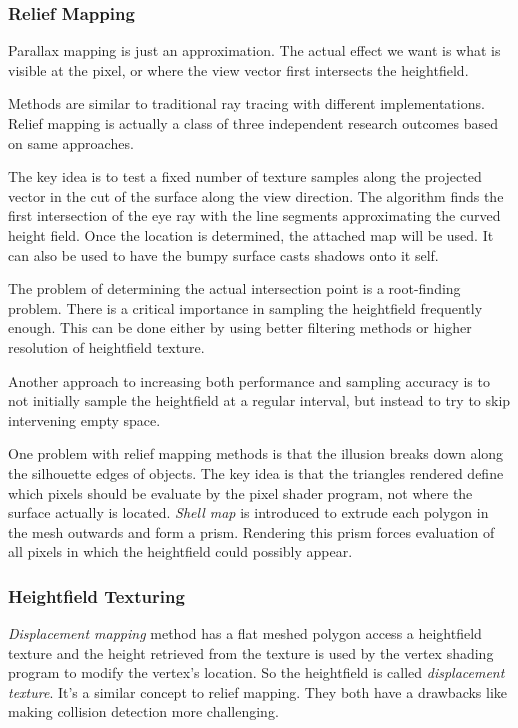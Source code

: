 \documentclass[10pt, a4paper]{article}
\begin{document}
    
    \subsubsection{Relief Mapping}
        Parallax mapping is just an approximation. The actual effect we want is what is visible at the pixel, or where the view vector first  intersects the heightfield. 

        Methods are similar to traditional ray tracing with different implementations. Relief mapping is actually a class of three independent research outcomes based on same approaches. 

        The key idea is to test a fixed number of texture samples along the projected vector in the cut of the surface along the view direction. The algorithm finds the first intersection of the eye ray with the line segments approximating the curved height field. Once the location is determined, the attached map will be used. It can also be used to have the  bumpy surface casts shadows onto it self.  

        The problem of determining the actual intersection point is a root-finding problem. There is a critical importance in sampling the heightfield frequently enough. This can be done either by using better filtering methods or higher resolution of heightfield texture. 

        Another approach to increasing both performance and sampling accuracy is to not initially sample the heightfield at a regular interval, but instead to try to skip intervening empty space. 

        One problem with relief mapping methods is that the illusion breaks down along the silhouette edges of objects.  The key idea is that the triangles rendered define which pixels should be evaluate by the pixel shader program, not where the surface actually is located. \emph{Shell map} is introduced to extrude each polygon in the mesh outwards and form a prism. Rendering this prism forces evaluation of all pixels in which the heightfield could possibly appear. 
    \subsubsection{Heightfield Texturing}
        \emph{Displacement mapping} method has a flat meshed polygon access a heightfield texture and the height retrieved from the texture is used by the vertex shading program to modify the vertex's location. So the heightfield is called \emph{displacement texture}. It's a similar concept to relief mapping. They both have a drawbacks like making collision detection more challenging. 
\end{document}
